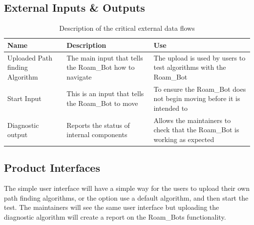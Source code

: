 \subsection{External Inputs \& Outputs}

\begin{table}[!htbp]
    \centering
    \vspace*{\fill} %
    \begin{tabular}{| >{\centering\arraybackslash} m{1.5in} | >{\centering\arraybackslash} m{2.5in} | >{\centering\arraybackslash} m{2in} |}
    \hline
     \textbf{Name} & \textbf{Description} & \textbf{Use} \\ \hline
     Uploaded Path finding Algorithm  & The main input that tells the Roam\_Bot how to navigate & The upload is used by users to test algorithms with the Roam\_Bot \\ \hline
     Start Input & This is an input that tells the Roam\_Bot to move & To ensure the Roam\_Bot does not begin moving before it is intended to \\ \hline
     Diagnostic output & Reports the status of internal components & Allows the maintainers to check that the Roam\_Bot is working as expected\\ \hline
    \end{tabular}
    \vspace*{\fill} %
    \caption{Description of the critical external data flows} 
\end{table}


\subsection{Product Interfaces}
The simple user interface will have a simple way for the users to upload their own path finding algorithms, or the option use a default algorithm, and then start the test. The maintainers will see the same user interface but uploading the diagnostic algorithm will create a report on the Roam\_Bots functionality.
